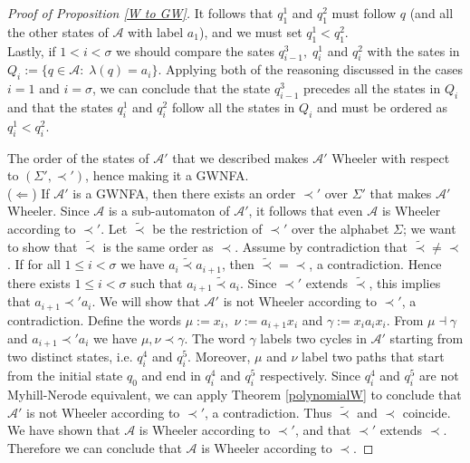 \documentclass[runningheads]{llncs}
\begin{document}
\begin{proof}[\noindent Proof of Proposition \ref{W to GW}]
It follows that $q_1^1$ and $q_1^2$ must follow $q$ (and all the other states of $\mathcal A$ with label $a_1$), and we must set $q_1^1 < q_1^2$. \\
Lastly, if $1 < i < \sigma$ we should compare the sates $q_{i-1}^3, \; q_i^1$ and $q_i^2$ with the sates in $Q_i:= \{ q \in \mathcal A: \; \lambda(q) = a_i \} $. Applying both of the reasoning discussed in the cases $i=1$ and $i=\sigma$, we can conclude that the state $q_{i-1}^3$ precedes all the states in $Q_i$ and that the states $q_i^1$ and $q_i^2$ follow all the states in $Q_i$ and must be ordered as $q_i^1 < q_i^2$.

The order of the states of $\mathcal A'$ that we described makes $\mathcal A'$ Wheeler with respect to $(\Sigma' , \prec' )$, hence making it a GWNFA.\\ %
\noindent($\Longleftarrow$) If $\mathcal A'$ is a GWNFA, then there exists an order $\prec'$ over $\Sigma'$ that makes $\mathcal A'$ Wheeler. Since $\mathcal A$ is a sub-automaton of $\mathcal A'$, it follows that even $\mathcal A$ is Wheeler according to $\prec'$. 
Let $\widetilde \prec$ be the restriction of $\prec'$ over the alphabet $\Sigma$; we want to show that $\widetilde \prec$ is the same order as $\prec$. Assume by contradiction that $\widetilde \prec \ne \prec$. 
If for all $1 \le i < \sigma$ we have $a_i \widetilde \prec a_{i+1}$, then $\widetilde \prec = \prec$, a contradiction. Hence there exists $1 \le i < \sigma$ such that $a_{i+1} \widetilde \prec a_{i}$. Since $\prec'$ extends $\widetilde \prec$, this implies that $a_{i+1} \prec' a_{i}$. We will show that $\mathcal A'$ is not Wheeler according to $\prec'$, a contradiction. 
Define the words $\mu:=x_i,$ $\nu:=a_{i+1}x_i$ and $\gamma:=x_ia_ix_i$. From $\mu \dashv \gamma$ and $a_{i+1} \prec' a_{i}$ we have $\mu, \nu \prec \gamma$. The word $\gamma$ labels two cycles in $\mathcal A'$ starting from two distinct states, i.e. $q_i^4$ and $q_i^5$. 
Moreover, $\mu$ and $\nu$ label two paths that start from the initial state $q_0$ and end in $q_i^4$ and $q_i^5$ respectively. Since $q_i^4$ and $q_i^5$ are not Myhill-Nerode equivalent, we can apply Theorem \ref{polynomialW} to conclude that $\mathcal A'$ is not Wheeler according to $\prec'$, a contradiction. 
Thus $\widetilde \prec$ and $\prec$ coincide.\\
We have shown that $\mathcal A$ is Wheeler according to $\prec'$, and that $\prec'$ extends $\prec$. Therefore we can conclude that $\mathcal A$ is Wheeler according to $\prec$.
\end{proof}
\end{document}
